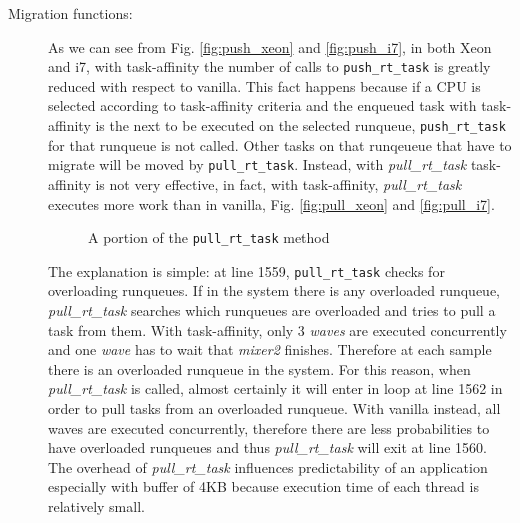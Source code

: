 \begin{description}
\item[Migration functions:] As we can see from Fig. \ref{fig:push_xeon} and \ref{fig:push_i7}, in both Xeon and i7, with task-affinity the number of calls 
to \texttt{push\_rt\_task} is greatly reduced with respect to vanilla. This fact happens because if a CPU is selected according to task-affinity criteria 
and the enqueued task with task-affinity is the next to be executed on the selected runqueue, \texttt{push\_rt\_task} for that runqueue is not called. 
Other tasks on that runqeueue that have to migrate will be moved by \texttt{pull\_rt\_task}. Instead, with \textit{pull\_rt\_task} task-affinity is not 
very effective, in fact, with task-affinity, \textit{pull\_rt\_task} executes more work than in vanilla, Fig. \ref{fig:pull_xeon} and \ref{fig:pull_i7}.

\begin{figure}[h]
  \lstset{basicstyle=\footnotesize, language=c, captionpos=b, frame=single,label=lis:steps}
  
  \label{code:pull_task_code}
  \caption{A portion of the \texttt{pull\_rt\_task} method}
\end{figure}

The explanation is simple: at line 1559, \texttt{pull\_rt\_task} checks for overloading runqueues. If in the system there 
is any overloaded runqueue, \textit{pull\_rt\_task} searches which runqueues are overloaded and tries to pull a task from them. With task-affinity, only 3 
\textit{waves} are executed concurrently and one \textit{wave} has to wait that \textit{mixer2} finishes. Therefore at each sample there is an overloaded 
runqueue in the system. For this reason, when \textit{pull\_rt\_task} is called, almost certainly it will enter in loop at line 1562 in order to pull tasks 
from an overloaded runqueue. With vanilla instead, all waves are executed concurrently, therefore there are less probabilities to have overloaded runqueues 
and thus \textit{pull\_rt\_task} will exit at line 1560. The overhead of \textit{pull\_rt\_task} influences predictability of an application especially with 
buffer of 4KB because execution time of each thread is relatively small.

\end{description}

